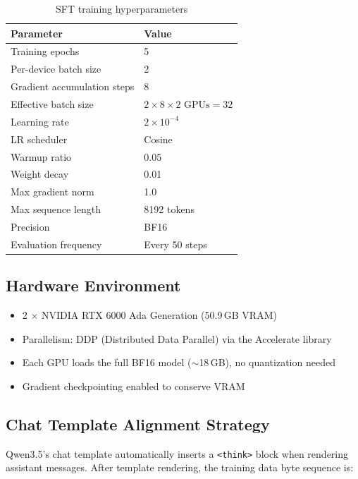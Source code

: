 \documentclass[12pt, a4paper]{article}
\begin{document}
\begin{table}[H]
\centering
\caption{SFT training hyperparameters}
\label{tab:sft-config}
\small
\begin{tabular}{ll}
\toprule
\textbf{Parameter} & \textbf{Value} \\
\midrule
Training epochs                & 5 \\
Per-device batch size          & 2 \\
Gradient accumulation steps    & 8 \\
Effective batch size           & $2 \times 8 \times 2\text{ GPUs} = 32$ \\
Learning rate                  & $2 \times 10^{-4}$ \\
LR scheduler                  & Cosine \\
Warmup ratio                  & 0.05 \\
Weight decay                  & 0.01 \\
Max gradient norm             & 1.0 \\
Max sequence length           & 8192 tokens \\
Precision                     & BF16 \\
Evaluation frequency          & Every 50 steps \\
\bottomrule
\end{tabular}
\end{table}

\subsection{Hardware Environment}

\begin{itemize}
  \item 2 $\times$ NVIDIA RTX 6000 Ada Generation (50.9\,GB VRAM)
  \item Parallelism: DDP (Distributed Data Parallel) via the Accelerate library
  \item Each GPU loads the full BF16 model ($\sim$18\,GB), no quantization needed
  \item Gradient checkpointing enabled to conserve VRAM
\end{itemize}

\subsection{Chat Template Alignment Strategy}
\label{sec:chat-template}

Qwen3.5's chat template automatically inserts a \texttt{<think>} block when rendering assistant messages. After template rendering, the training data byte sequence is:
\end{document}
